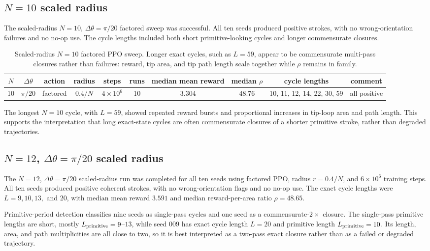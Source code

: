 \documentclass[11pt]{article}
\newcommand{\dth}{\Delta\theta}
\begin{document}
\subsection{$N=10$ scaled radius}

The scaled-radius $N=10$, $\dth=\pi/20$ factored sweep was successful. All ten seeds produced positive strokes, with no wrong-orientation failures and no no-op use. The cycle lengths included both short primitive-looking cycles and longer commensurate closures.

\begin{table}[htbp]
\centering
\scriptsize
\begin{tabular}{cccccccccc}
\toprule
$N$ & $\dth$ & action & radius & steps & runs & median mean reward & median $\rho$ & cycle lengths & comment \\
\midrule
10 & $\pi/20$ & factored & $0.4/N$ & $4\times 10^6$ & 10 & 3.304 & 48.76 & 10, 11, 12, 14, 22, 30, 59 & all positive \\
\bottomrule
\end{tabular}
\caption{Scaled-radius $N=10$ factored PPO sweep. Longer exact cycles, such as $L=59$, appear to be commensurate multi-pass closures rather than failures: reward, tip area, and tip path length scale together while $\rho$ remains in family.}
\label{tab:phase6-n10-scaled}
\end{table}

The longest $N=10$ cycle, with $L=59$, showed repeated reward bursts and proportional increases in tip-loop area and path length. This supports the interpretation that long exact-state cycles are often commensurate closures of a shorter primitive stroke, rather than degraded trajectories.

\subsection{$N=12$, $\dth=\pi/20$ scaled radius}

The $N=12$, $\dth=\pi/20$ scaled-radius run was completed for all ten seeds using factored PPO, radius $r=0.4/N$, and $6\times 10^6$ training steps. All ten seeds produced positive coherent strokes, with no wrong-orientation flags and no no-op use. The exact cycle lengths were $L=9,10,13,$ and $20$, with median mean reward $3.591$ and median reward-per-area ratio $\rho=48.65$.

Primitive-period detection classifies nine seeds as single-pass cycles and one seed as a commensurate-$2\times$ closure. The single-pass primitive lengths are short, mostly $L_{\rm primitive}=9$--$13$, while seed 009 has exact cycle length $L=20$ and primitive length $L_{\rm primitive}=10$. Its length, area, and path multiplicities are all close to two, so it is best interpreted as a two-pass exact closure rather than as a failed or degraded trajectory.
\end{document}
